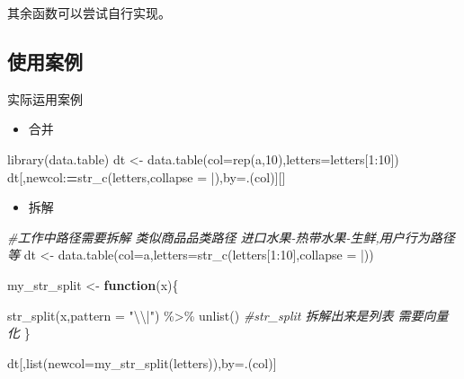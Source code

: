 \documentclass[
]{book}
\newenvironment{Shaded}{\begin{snugshade}}{\end{snugshade}}
\newcommand{\AttributeTok}[1]{\textcolor[rgb]{0.77,0.63,0.00}{#1}}
\newcommand{\CommentTok}[1]{\textcolor[rgb]{0.56,0.35,0.01}{\textit{#1}}}
\newcommand{\ControlFlowTok}[1]{\textcolor[rgb]{0.13,0.29,0.53}{\textbf{#1}}}
\newcommand{\DecValTok}[1]{\textcolor[rgb]{0.00,0.00,0.81}{#1}}
\newcommand{\ErrorTok}[1]{\textcolor[rgb]{0.64,0.00,0.00}{\textbf{#1}}}
\newcommand{\FunctionTok}[1]{\textcolor[rgb]{0.00,0.00,0.00}{#1}}
\newcommand{\NormalTok}[1]{#1}
\newcommand{\OtherTok}[1]{\textcolor[rgb]{0.56,0.35,0.01}{#1}}
\newcommand{\SpecialCharTok}[1]{\textcolor[rgb]{0.00,0.00,0.00}{#1}}
\newcommand{\StringTok}[1]{\textcolor[rgb]{0.31,0.60,0.02}{#1}}
\providecommand{\tightlist}{%
  \setlength{\itemsep}{0pt}\setlength{\parskip}{0pt}}
\begin{document}
其余函数可以尝试自行实现。

\hypertarget{ux4f7fux7528ux6848ux4f8b}{%
\subsection{使用案例}\label{ux4f7fux7528ux6848ux4f8b}}

实际运用案例

\begin{itemize}
\tightlist
\item
  合并
\end{itemize}

\begin{Shaded}
\begin{Highlighting}[]
\FunctionTok{library}\NormalTok{(data.table)}
\NormalTok{dt }\OtherTok{\textless{}{-}} \FunctionTok{data.table}\NormalTok{(}\AttributeTok{col=}\FunctionTok{rep}\NormalTok{(}\StringTok{\textquotesingle{}a\textquotesingle{}}\NormalTok{,}\DecValTok{10}\NormalTok{),}\AttributeTok{letters=}\NormalTok{letters[}\DecValTok{1}\SpecialCharTok{:}\DecValTok{10}\NormalTok{])}
\NormalTok{dt[,newcol}\SpecialCharTok{:}\ErrorTok{=}\FunctionTok{str\_c}\NormalTok{(letters,}\AttributeTok{collapse =} \StringTok{\textquotesingle{}|\textquotesingle{}}\NormalTok{),by}\OtherTok{=}\NormalTok{.(col)][]}
\end{Highlighting}
\end{Shaded}

\begin{itemize}
\tightlist
\item
  拆解
\end{itemize}

\begin{Shaded}
\begin{Highlighting}[]

\CommentTok{\#工作中路径需要拆解 类似商品品类路径 进口水果{-}热带水果{-}生鲜,用户行为路径等}
\NormalTok{dt }\OtherTok{\textless{}{-}} \FunctionTok{data.table}\NormalTok{(}\AttributeTok{col=}\StringTok{\textquotesingle{}a\textquotesingle{}}\NormalTok{,}\AttributeTok{letters=}\FunctionTok{str\_c}\NormalTok{(letters[}\DecValTok{1}\SpecialCharTok{:}\DecValTok{10}\NormalTok{],}\AttributeTok{collapse =} \StringTok{\textquotesingle{}|\textquotesingle{}}\NormalTok{))}

\NormalTok{my\_str\_split }\OtherTok{\textless{}{-}} \ControlFlowTok{function}\NormalTok{(x)\{}
  
  \FunctionTok{str\_split}\NormalTok{(x,}\AttributeTok{pattern =} \StringTok{"}\SpecialCharTok{\textbackslash{}\textbackslash{}}\StringTok{|"}\NormalTok{) }\SpecialCharTok{\%\textgreater{}\%} \FunctionTok{unlist}\NormalTok{()  }\CommentTok{\#str\_split 拆解出来是列表 需要向量化}
\NormalTok{\}}

\NormalTok{dt[,}\FunctionTok{list}\NormalTok{(}\AttributeTok{newcol=}\FunctionTok{my\_str\_split}\NormalTok{(letters)),by}\OtherTok{=}\NormalTok{.(col)]}
\end{Highlighting}
\end{Shaded}
\end{document}
